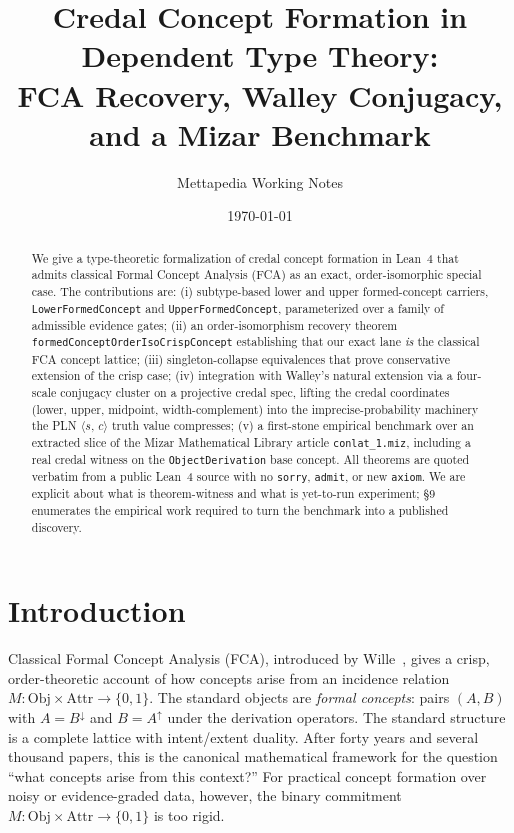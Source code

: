 \documentclass[]{article}
\title{Credal Concept Formation in Dependent Type Theory:\\
       FCA Recovery, Walley Conjugacy, and a Mizar Benchmark}
\author{Mettapedia Working Notes}
\date{\today}
\newcommand{\lid}[1]{{\ttfamily\nolinkurl{#1}}}
\newcommand{\STV}[2]{\langle #1,\, #2 \rangle}
\begin{document}
\maketitle

\begin{abstract}
We give a type-theoretic formalization of credal concept formation in Lean~4 that admits
classical Formal Concept Analysis (FCA) as an exact, order-isomorphic special case.
The contributions are: (i) subtype-based lower and upper formed-concept carriers,
\lid{LowerFormedConcept} and \lid{UpperFormedConcept}, parameterized over a family of
admissible evidence gates; (ii) an order-isomorphism recovery theorem
\lid{formedConceptOrderIsoCrispConcept} establishing that our exact lane \emph{is} the
classical FCA concept lattice; (iii) singleton-collapse equivalences that prove
conservative extension of the crisp case; (iv) integration with Walley's natural
extension via a four-scale conjugacy cluster on a projective credal spec, lifting the
credal coordinates (lower, upper, midpoint, width-complement) into the
imprecise-probability machinery the PLN $\STV{s}{c}$ truth value compresses; (v) a
first-stone empirical benchmark over an extracted slice of the Mizar Mathematical
Library article \lid{conlat\_1.miz}, including a real credal witness on the
\lid{ObjectDerivation} base concept. All theorems are quoted verbatim from a public
Lean~4 source with no \lid{sorry}, \lid{admit}, or new \lid{axiom}. We are explicit
about what is theorem-witness and what is yet-to-run experiment; \S 9 enumerates the
empirical work required to turn the benchmark into a published discovery.
\end{abstract}

\section{Introduction}\label{sec:intro}

Classical Formal Concept Analysis (FCA), introduced by Wille~\cite{wille1982}, gives a
crisp, order-theoretic account of how concepts arise from an incidence relation
$M : \mathrm{Obj} \times \mathrm{Attr} \to \{0,1\}$. The standard objects are
\emph{formal concepts}: pairs $(A, B)$ with $A = B^\downarrow$ and $B = A^\uparrow$
under the derivation operators. The standard structure is a complete lattice with
intent/extent duality. After forty years and several thousand papers, this is the
canonical mathematical framework for the question ``what concepts arise from this
context?'' For practical concept formation over noisy or evidence-graded data,
however, the binary commitment ${M : \mathrm{Obj} \times \mathrm{Attr} \to \{0,1\}}$ is
too rigid.
\end{document}

